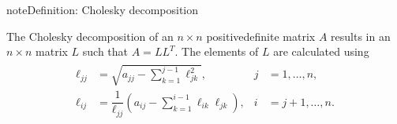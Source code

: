 \documentclass[letterpaper,10pt,english]{jupyterBook}
\begin{document}
\begin{sphinxadmonition}{note}{Definition: Cholesky decomposition}

\sphinxAtStartPar
The Cholesky decomposition of an \(n \times n\) positive\sphinxhyphen{}definite matrix \(A\) results in an \(n \times n\) matrix \(L\) such that \(A = LL^T\). The elements of \(L\) are calculated using
\begin{equation}\label{equation:6_Direct_methods/6.3_Cholesky_decomposition:cholesky-equation}
\begin{split}\begin{align}
    \ell_{jj} &= \sqrt{a_{jj} - \sum_{k=1}^{j-1} \ell_{jk}^2 }, & j &= 1, \ldots, n,\\
    \ell_{ij} &= \dfrac{1}{\ell_{jj} }\left(a_{ij} -\displaystyle \sum_{k=1}^{i-1} \ell_{ik} \ell_{jk} \right), & i &= j + 1,\ldots ,n.
\end{align}\end{split}
\end{equation}\end{sphinxadmonition}
\end{document}

